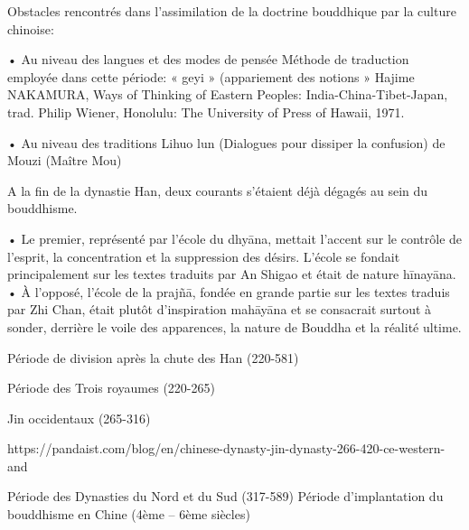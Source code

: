 Obstacles rencontrés dans l’assimilation de la doctrine bouddhique par la culture chinoise:

•	Au niveau des langues et des modes de pensée
Méthode de traduction employée dans cette période: « geyi »   (appariement des notions »
Hajime NAKAMURA, Ways of Thinking of Eastern Peoples: India-China-Tibet-Japan, trad. Philip Wiener, Honolulu: The University of Press of Hawaii, 1971.

•	Au niveau des traditions
Lihuo lun (Dialogues pour dissiper la confusion) de Mouzi (Maître Mou)
 
A la fin de la dynastie Han, deux courants s’étaient déjà dégagés au sein du bouddhisme.

•	Le premier, représenté par l’école du dhyāna, mettait l’accent sur le contrôle de l’esprit, la concentration et la suppression des désirs. L’école se fondait principalement sur les textes traduits par An Shigao et était de nature hīnayāna.
•	À l’opposé, l’école de la prajñā, fondée en grande partie sur les textes traduis par Zhi Chan, était plutôt d’inspiration mahāyāna et se consacrait surtout à sonder, derrière le voile des apparences, la nature de Bouddha et la réalité ultime.
 






Période de division après la chute des Han (220-581)
 
Période des Trois royaumes (220-265)
 

Jin occidentaux (265-316)
 




































https://pandaist.com/blog/en/chinese-dynasty-jin-dynasty-266-420-ce-western-and
 
Période des Dynasties du Nord et du Sud (317-589)
Période d’implantation du bouddhisme en Chine (4ème – 6ème siècles)
 
